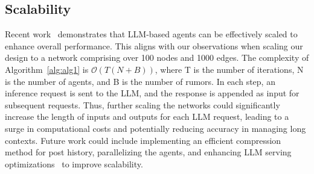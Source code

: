 \subsection{Scalability} 
Recent work~\cite{li2024agentsneed} demonstrates that LLM-based agents can be effectively scaled to enhance overall performance. 
This aligns with our observations when scaling our design to a network comprising over 100 nodes and 1000 edges.
The complexity of Algorithm~\ref{alg:alg1} is $\mathcal{O}(T(N+B))$, where T is the number of iterations, N is the number of agents, and B is the number of rumors.
In each step, an inference request is sent to the LLM, and the response is appended as input for subsequent requests. 
Thus, further scaling the networks could significantly increase the length of inputs and outputs for each LLM request, leading to a surge in computational costs and potentially reducing accuracy in managing long contexts. 
Future work could include implementing an efficient compression method for post history, parallelizing the agents, and enhancing LLM serving optimizations~\cite{zheng2023efficiently} to improve scalability.
